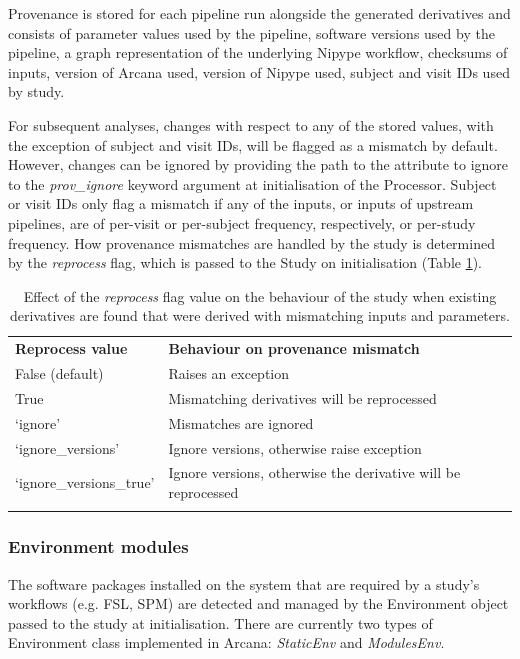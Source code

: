 \documentclass[smallextended]{svjour3}       %
\begin{document}
Provenance is stored for each pipeline run alongside the generated
derivatives and consists of parameter values used by the pipeline,
software versions used by the pipeline, a graph representation of the
underlying Nipype workflow, checksums of inputs, version of Arcana used,
version of Nipype used, subject and visit IDs used by study.

For subsequent analyses, changes with respect to any of the stored values, with
the exception of subject and visit IDs, will be flagged as a mismatch by default.
However, changes can be ignored by providing the path to the attribute to ignore
to the \emph{prov\_ignore} keyword argument at initialisation of the Processor.
Subject or visit IDs only flag a mismatch if any of the inputs, or
inputs of upstream pipelines, are of per-visit or per-subject frequency,
respectively, or per-study frequency. How provenance mismatches are handled by the
study is determined by the \emph{reprocess} flag, which is passed to the
Study on initialisation (Table \ref{tbl:reprocess-flag}).


\begin{table}
\caption{Effect of the \emph{reprocess} flag value on the
behaviour of the study when existing derivatives are found that were
derived with mismatching inputs and parameters.}
\label{tbl:reprocess-flag} 
\begin{tabular}{ll}
\hline\noalign{\smallskip}
\textbf{Reprocess value} & \textbf{Behaviour on provenance mismatch} \\
\noalign{\smallskip}\hline\noalign{\smallskip}
False (default) & Raises an exception \\
True & Mismatching derivatives will be reprocessed \\
`ignore' & Mismatches are ignored \\
`ignore\_versions' & Ignore versions, otherwise raise exception \\
`ignore\_versions\_true' & Ignore versions, otherwise the derivative will be reprocessed \\
\noalign{\smallskip}\hline
\end{tabular}
\end{table}

\subsubsection*{Environment modules}

The software packages installed on the system that are required by a study's
workflows (e.g. FSL, SPM) are detected and managed by
the Environment object passed to the study at initialisation.
There are currently two types of Environment class implemented in Arcana:
\emph{StaticEnv} and \emph{ModulesEnv}.
\end{document}
